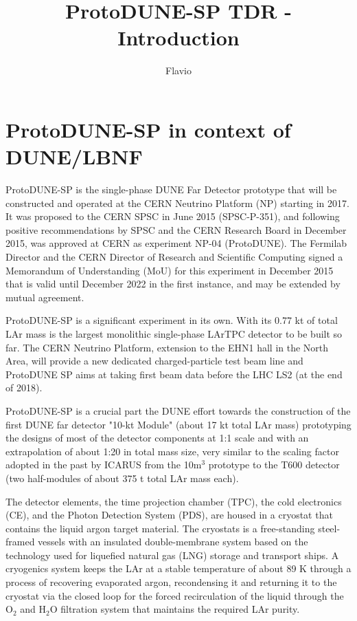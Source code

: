 \documentclass[11pt, oneside]{article}   	%
\title{ProtoDUNE-SP TDR - Introduction}
\author{Flavio}
\begin{document}
\maketitle

\section{ProtoDUNE-SP in context of DUNE/LBNF}

ProtoDUNE-SP is the single-phase DUNE Far Detector prototype that will be constructed and operated at the CERN Neutrino Platform (NP) starting in 2017. It was proposed to the CERN SPSC in June 2015 (SPSC-P-351), and following positive recommendations by SPSC and the CERN Research Board in December 2015, was approved at CERN as experiment NP-04 (ProtoDUNE). The Fermilab Director and the CERN Director of Research and Scientific Computing signed a Memorandum of Understanding (MoU) for this experiment in December 2015 that is valid until December 2022 in the first instance, and may be extended by mutual agreement. 

ProtoDUNE-SP is a significant experiment in its own. With its 0.77 kt of total LAr mass is the
largest monolithic single-phase LArTPC detector to be built so far. 
The CERN Neutrino Platform, extension to the EHN1 hall in the North Area, will provide a new dedicated charged-particle test beam line and ProtoDUNE SP aims at taking first beam data before the LHC LS2 (at the end of 2018). 

ProtoDUNE-SP is a crucial part the DUNE effort towards the construction of the first DUNE far detector "10-kt Module" (about 17 kt total LAr mass) prototyping the designs of most of the detector components at 1:1 scale and with an extrapolation of about 1:20 in total mass size, very similar to the scaling factor adopted in the past by ICARUS from the 10m$^3$ prototype to the T600 detector (two half-modules of about 375 t total LAr mass each).

The detector elements, the time projection chamber (TPC), the cold electronics (CE), and the Photon Detection System (PDS), are housed in a cryostat that contains the liquid argon target material. The cryostats is a free-standing steel-framed vessels with an insulated double-membrane system based on the technology used for liquefied natural gas (LNG) storage and transport ships. 
A cryogenics system keeps the LAr at a stable temperature of about 89 K through a process of recovering evaporated argon, recondensing it and returning it to the cryostat via the closed loop 
for the forced recirculation of the liquid through the O$_2$ and H$_2$O filtration system that maintains the required LAr purity. 
\end{document}
